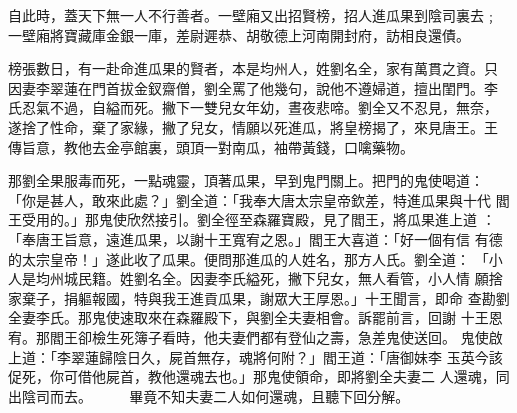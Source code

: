 \begin{pinyinscope}
{自此時，蓋天下無一人不行善者。一壁廂又出招賢榜，招人進瓜果到陰司裏去﹔
一壁廂將寶藏庫金銀一庫，差尉遲恭、胡敬德上河南開封府，訪相良還債。

榜張數日，有一赴命進瓜果的賢者，本是均州人，姓劉名全，家有萬貫之資。只
因妻李翠蓮在門首拔金釵齋僧，劉全罵了他幾句，說他不遵婦道，擅出閨門。李
氏忍氣不過，自縊而死。撇下一雙兒女年幼，晝夜悲啼。劉全又不忍見，無奈，
遂捨了性命，棄了家緣，撇了兒女，情願以死進瓜，將皇榜揭了，來見唐王。王
傳旨意，教他去金亭館裏，頭頂一對南瓜，袖帶黃錢，口噙藥物。

那劉全果服毒而死，一點魂靈，頂著瓜果，早到鬼門關上。把門的鬼使喝道：
「你是甚人，敢來此處？」劉全道：「我奉大唐太宗皇帝欽差，特進瓜果與十代
閻王受用的。」那鬼使欣然接引。劉全徑至森羅寶殿，見了閻王，將瓜果進上道
：「奉唐王旨意，遠進瓜果，以謝十王寬宥之恩。」閻王大喜道：「好一個有信
有德的太宗皇帝！」遂此收了瓜果。便問那進瓜的人姓名，那方人氏。劉全道：
「小人是均州城民籍。姓劉名全。因妻李氏縊死，撇下兒女，無人看管，小人情
願捨家棄子，捐軀報國，特與我王進貢瓜果，謝眾大王厚恩。」十王聞言，即命
查勘劉全妻李氏。那鬼使速取來在森羅殿下，與劉全夫妻相會。訴罷前言，回謝
十王恩宥。那閻王卻檢生死簿子看時，他夫妻們都有登仙之壽，急差鬼使送回。
鬼使啟上道：「李翠蓮歸陰日久，屍首無存，魂將何附？」閻王道：「唐御妹李
玉英今該促死，你可借他屍首，教他還魂去也。」那鬼使領命，即將劉全夫妻二
人還魂，同出陰司而去。
　　
    畢竟不知夫妻二人如何還魂，且聽下回分解。





}
\end{pinyinscope}
